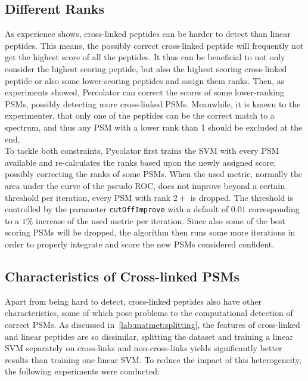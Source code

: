 \subsection{Different Ranks}
As experience shows, cross-linked peptides can be harder to detect than linear peptides. This means, the possibly correct cross-linked peptide will frequently not get the highest score of all the peptides. It thus can be beneficial to not only consider the highest scoring peptide, but also the highest scoring cross-linked peptide or also some lower-scoring peptides and assign them ranks. Then, as experiments showed, Percolator can correct the scores of some lower-ranking PSMs, possibly detecting more cross-linked PSMs. Meanwhile, it is known to the experimenter, that only one of the peptides can be the correct match to a spectrum, and thus any PSM with a lower rank than 1 should be excluded at the end.\\
To tackle both constraints, Pycolator first trains the SVM with every PSM available and re-calculates the ranks based upon the newly assigned score, possibly correcting the ranks of some PSMs. When the used metric, normally the area under the curve of the pseudo ROC, does not improve beyond a certain threshold per iteration, every PSM with rank $2+$ is dropped. The threshold is controlled by the parameter \texttt{cutOffImprove} with a default of $0.01$ corresponding to a $1\%$ increase of the used metric per iteration. Since also some of the best scoring PSMs will be dropped, the algorithm then runs some more iterations in order to properly integrate and score the new PSMs considered confident.
\subsection{Characteristics of Cross-linked PSMs}
Apart from being hard to detect, cross-linked peptides also have other characteristics, some of which pose problems to the computational detection of correct PSMs. As discussed in~\ref{lab:matmet:splitting}, the features of cross-linked and linear peptides are so dissimilar, splitting the dataset and training a linear SVM separately on cross-links and non-cross-links yields significantly better results than training one linear SVM. To reduce the impact of this heterogeneity, the following experiments were conducted:
